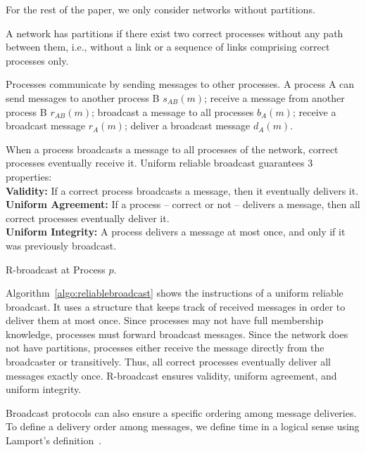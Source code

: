 For the rest of the paper, we only consider networks without partitions.

\begin{definition}
  A network has partitions if there exist two correct processes without any path
  between them, i.e., without a link or a sequence of links comprising correct
  processes only.
\end{definition}

Processes communicate by sending messages to other processes.  A process A can
send messages to another process B $s_{AB}(m)$; receive a message from another
process B $r_{AB}(m)$; broadcast a message to all processes $b_A(m)$; receive a
broadcast message $r_A(m)$; deliver a broadcast message $d_A(m)$.

\begin{definition}
  When a process broadcasts a message to all processes of the network, correct
  processes eventually receive it.
  Uniform reliable broadcast guarantees 3 properties: \\
  \textbf{Validity:} If a correct process broadcasts a message, then it
  eventually delivers it. \\
  \textbf{Uniform Agreement:} If a process -- correct or not -- delivers a
  message, then all correct processes eventually deliver it. \\
  \textbf{Uniform Integrity:} A process delivers a message at most once, and
  only if it was previously broadcast.
\end{definition}

\begin{algorithm}[h]
  
  \caption{\label{algo:reliablebroadcast}R-broadcast at Process $p$.}
\end{algorithm}

Algorithm~\ref{algo:reliablebroadcast} shows the instructions of a uniform
reliable broadcast. It uses a structure that keeps track of received messages in
order to deliver them at most once.  Since processes may not have full
membership knowledge, processes must forward broadcast messages. Since the
network does not have partitions, processes either receive the message directly
from the broadcaster or transitively. Thus, all correct processes eventually
deliver all messages exactly once. R-broadcast ensures validity, uniform
agreement, and uniform integrity.

Broadcast protocols can also ensure a specific ordering among message
deliveries.  To define a delivery order among messages, we define time in a
logical sense using Lamport's definition~\cite{lamport1978time}.

